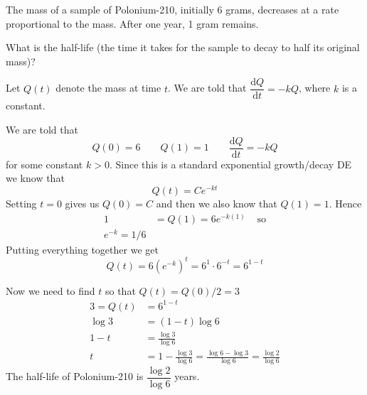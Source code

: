 \documentclass[12pt]{exam}
\renewcommand{\questionlabel}{Q\thequestion.}
\newcommand{\blank}{
  \ifprintanswers{}\else{\vfill}\fi
}
\newcommand{\dee}[1]{{\mathrm{d}#1}}
\newcommand{\diff}[2]{\dfrac{\dee{#1}}{\dee{#2}}}
\begin{document}
\begin{questions}

	\newpage
	\renewcommand{\questionlabel}{DiffEq}
	\question[7] The mass of a sample of Polonium-210, initially 6 grams, decreases at a rate proportional to the mass. After one year, 1 gram remains.

	What is the half-life (the time it takes for the sample to decay to half its original mass)?
	\begin{solution}
		Let \(Q(t)\) denote the mass at time \(t\). We are told that $\diff{Q}{t}=-kQ$, where $k$ is a constant.

		We are told that
		\[
			Q(0)=6 \qquad Q(1)=1 \qquad \diff{Q}{t}=-kQ
		\]
		for some constant \(k>0\). Since this is a standard exponential growth/decay DE we know that
		\[
			Q(t) = C e^{-kt}
		\]
		Setting \(t=0\) gives us  \(Q(0)=C\) and then we also know that \(Q(1)=1\). Hence
		\begin{align*}
			1 & =Q(1)=6e^{-k(1)} & \text{ so} \\
			e^{-k}=1/6
		\end{align*}
		Putting everything together we get
		\[
			Q(t)=6(e^{-k})^t = 6^1 \cdot 6^{-t} = 6^{1-t}
		\]

		Now we need to find \(t\) so that \(Q(t)=Q(0)/2 = 3\)
		\begin{align*}
			3=Q(t) & =6^{1-t}                                                                             \\
			\log 3 & =(1-t)\log 6                                                                         \\
			1-t    & = \frac{\log 3}{\log 6}                                                              \\
			t      & = 1 - \frac{\log 3}{\log 6} = \frac{\log 6 - \log 3}{\log 6} = \frac{\log 2}{\log 6}
		\end{align*}
		The half-life of Polonium-210 is $\dfrac{\log 2}{\log 6}$ years.


\end{solution}
\end{questions}
\end{document}
